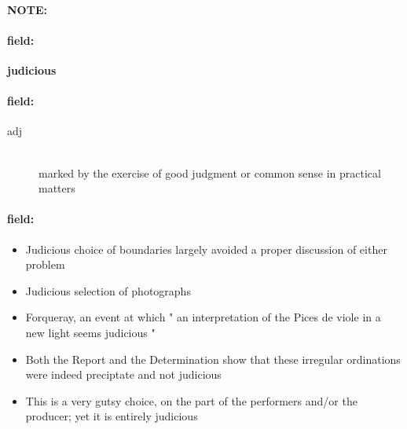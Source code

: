\documentclass[12pt]{article}
\newenvironment{note}{\paragraph{NOTE:}}{}
\newenvironment{field}{\paragraph{field:}}{}
\begin{document}
\begin{note}
\begin{field}
\textbf{\large judicious}
\end{field}


\begin{field}
\begin{description}
\item[adj] \hfill \\ 
marked by the exercise of good judgment or common sense in practical matters

\end{description}
\end{field}

\begin{field}
\begin{itemize}
\item Judicious choice of boundaries largely avoided a proper discussion of either problem
\item Judicious selection of photographs
\item Forqueray, an event at which " an interpretation of the Pices de viole in a new light seems judicious " 
\item Both the Report and the Determination show that these irregular ordinations were indeed preciptate and not judicious
\item This is a very gutsy choice, on the part of the performers and/or the producer; yet it is entirely judicious
\end{itemize}
\end{field}
\end{note}
\end{document}
